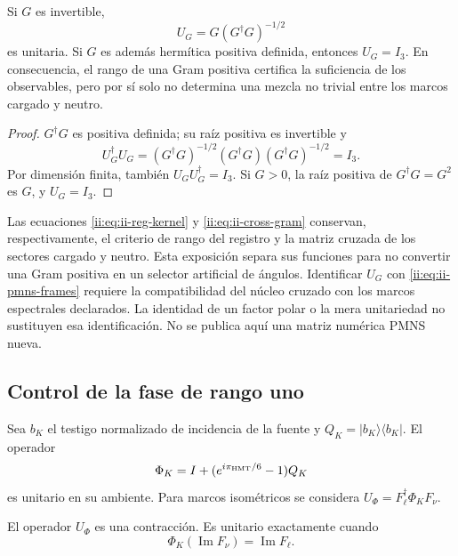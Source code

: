 \begin{proposition}
Si \(G\) es invertible,
\begin{equation}
 U_G=G(G^\dagger G)^{-1/2}
 \label{ii:eq:ii-polar}
\end{equation}
es unitaria. Si \(G\) es además hermítica positiva definida, entonces
\(U_G=I_3\). En consecuencia, el rango de una Gram positiva certifica
la suficiencia de los observables, pero por sí solo no determina una
mezcla no trivial entre los marcos cargado y neutro.
\end{proposition}

\begin{proof}
\(G^\dagger G\) es positiva definida; su raíz positiva es invertible y
\[
 U_G^\dagger U_G=(G^\dagger G)^{-1/2}(G^\dagger G)
 (G^\dagger G)^{-1/2}=I_3.
\]
Por dimensión finita, también
\(U_GU_G^\dagger=I_3\). Si \(G>0\), la raíz positiva de
\(G^\dagger G=G^2\) es \(G\), y \(U_G=I_3\).
\end{proof}

\begin{remark}
Las ecuaciones \eqref{ii:eq:ii-reg-kernel} y \eqref{ii:eq:ii-cross-gram}
conservan, respectivamente, el criterio de rango del registro y
la matriz cruzada de los sectores cargado y neutro. Esta exposición
separa sus funciones para no convertir una Gram positiva en un selector
artificial de ángulos. Identificar \(U_G\) con
\eqref{ii:eq:ii-pmns-frames} requiere la compatibilidad del núcleo cruzado
con los marcos espectrales declarados. La identidad de un factor polar
o la mera unitariedad no sustituyen esa identificación. No se publica
aquí una matriz numérica PMNS nueva.
\end{remark}

\subsection{Control de la fase de rango uno}

Sea \(b_K\) el testigo normalizado de incidencia de la fuente y
\(Q_K=|b_K\rangle\langle b_K|\). El operador
\begin{equation}
 \Phi_K=I+(e^{i\pi_{\rm HMT}/6}-1)Q_K
 \label{ii:eq:ii-rank-one-phase}
\end{equation}
es unitario en su ambiente. Para marcos isométricos se considera
\(U_\Phi=F_\ell^\dagger\Phi_KF_\nu\).

\begin{proposition}
El operador \(U_\Phi\) es una contracción. Es unitario exactamente
cuando
\begin{equation}
 \Phi_K(\operatorname{Im}F_\nu)=\operatorname{Im}F_\ell.
 \label{ii:eq:ii-phase-compatibility}
\end{equation}
\end{proposition}

